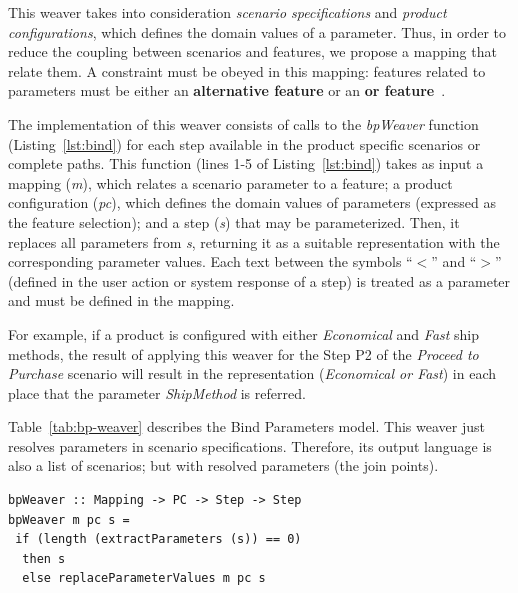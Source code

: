 \documentclass{acm_proc_article-sp}
\begin{document}
This weaver takes into consideration \emph{scenario specifications} and
\emph{product configurations}, which defines the domain values of a
parameter. Thus, in order to reduce the coupling between scenarios and features,
we propose a mapping that relate them. A constraint must be obeyed in this mapping: features related to parameters must be either an {\bf alternative feature} or an {\bf or feature}~\cite{gheyi-alloy-06,czarnecki-wsfactory-2005,czarnecki-book}.

The implementation of this weaver consists of calls to
the \emph{bpWeaver} function (Listing~\ref{lst:bind}) for each step
available in the product specific scenarios or complete paths. This
function (lines 1-5 of Listing~\ref{lst:bind}) takes as
input a mapping (\emph{m}), which relates a scenario parameter to a
feature; a product configuration (\emph{pc}), which defines
the domain values of parameters (expressed as the feature selection); and a step (\emph{s}) that may be parameterized. Then, it replaces all parameters
from \emph{s}, returning it as a suitable representation with the
corresponding parameter values. Each text between the symbols ``$<$'' and ``$>$''
(defined in the user action or system response of a
step) is treated as a parameter and must be defined in the
mapping.

For example, if a product is configured with either \emph{Economical} and
\emph{Fast} ship methods, the result of applying this weaver for
the Step P2 of the \emph{Proceed to Purchase} scenario will result in the
representation (\emph{Economical or Fast}) in each place that the parameter \emph{ShipMethod} is referred.

Table~\ref{tab:bp-weaver} describes the Bind Parameters model. This weaver just resolves parameters in scenario specifications. Therefore, its output language is also a list of scenarios; but with resolved parameters (the join points).

\begin{lstlisting}[belowskip=10pt,frame=tb,caption={Bind parameter weaver function},label=lst:bind]
bpWeaver :: Mapping -> PC -> Step -> Step
bpWeaver m pc s =
 if (length (extractParameters (s)) == 0)
  then s
  else replaceParameterValues m pc s
\end{lstlisting}
\end{document}
